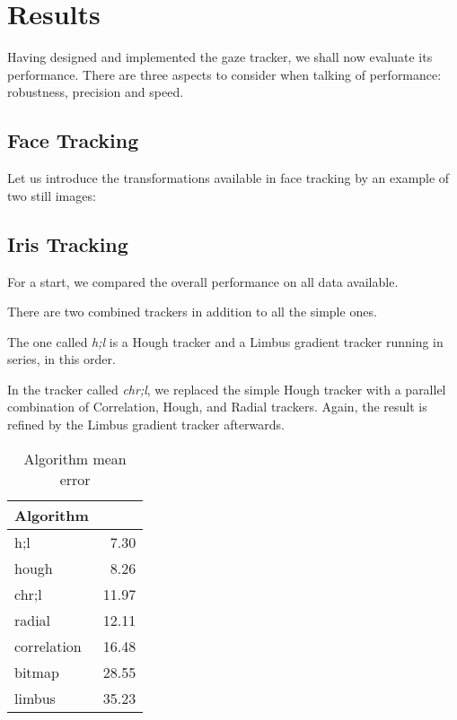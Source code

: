\chapter{Results}

Having designed and implemented the gaze tracker, we shall now evaluate its performance.
There are three aspects to consider when talking of performance: robustness, precision and speed.

\section{Face Tracking}
Let us introduce the transformations available in face tracking by an example of two still images:


\section{Iris Tracking}

For a start, we compared the overall performance on all data available.

There are two combined trackers in addition to all the simple ones.

The one called \textit{h;l} is a Hough tracker and a Limbus gradient tracker running in series, in this order.

In the tracker called \textit{chr;l}, we replaced the simple Hough tracker with a parallel combination of Correlation, Hough, and Radial trackers.
Again, the result is refined by the Limbus gradient tracker afterwards.

\begin{table}[h]
\centering
\begin{tabular}{l@{\hspace{1.5cm}}D{.}{.}{3.2}}
\toprule
\textbf{Algorithm} &  \\
\midrule
h;l & 7.30 \\
hough & 8.26 \\
chr;l & 11.97 \\
radial & 12.11 \\
correlation & 16.48 \\
bitmap & 28.55 \\
limbus & 35.23 \\
\bottomrule
\end{tabular}
\caption{Algorithm mean error}\label{t:algo-mean}
\end{table}

